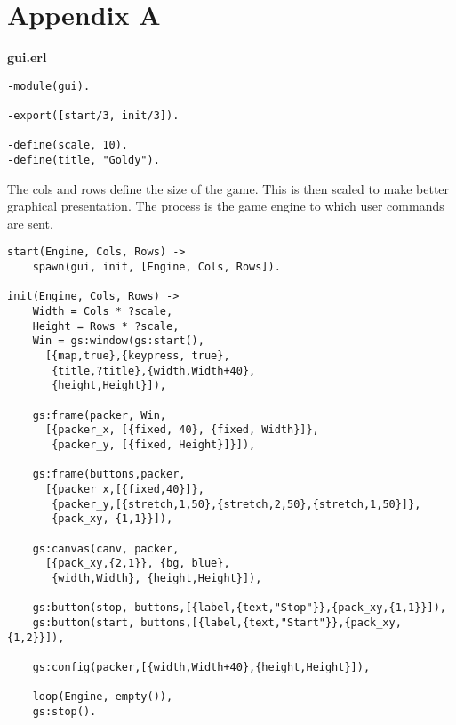 \documentclass[a4paper,11pt]{article}
\newcommand{\nnsection}[1]{
\section*{#1}
\addcontentsline{toc}{section}{#1}
}
\begin{document}
\nnsection{Appendix A}

{\bf gui.erl}

\begin{verbatim}
-module(gui).

-export([start/3, init/3]).

-define(scale, 10).
-define(title, "Goldy").
\end{verbatim}

The cols and rows define the size of the game. This is then scaled
to make better graphical presentation.  The process is the game
engine to which user commands are sent.

\begin{verbatim}
start(Engine, Cols, Rows) ->
    spawn(gui, init, [Engine, Cols, Rows]).

init(Engine, Cols, Rows) ->
    Width = Cols * ?scale,
    Height = Rows * ?scale,
    Win = gs:window(gs:start(),
      [{map,true},{keypress, true}, 
       {title,?title},{width,Width+40},
       {height,Height}]),

    gs:frame(packer, Win, 
      [{packer_x, [{fixed, 40}, {fixed, Width}]}, 
       {packer_y, [{fixed, Height}]}]),

    gs:frame(buttons,packer,
      [{packer_x,[{fixed,40}]},
       {packer_y,[{stretch,1,50},{stretch,2,50},{stretch,1,50}]},
       {pack_xy, {1,1}}]),

    gs:canvas(canv, packer,
      [{pack_xy,{2,1}}, {bg, blue}, 
       {width,Width}, {height,Height}]),

    gs:button(stop, buttons,[{label,{text,"Stop"}},{pack_xy,{1,1}}]),
    gs:button(start, buttons,[{label,{text,"Start"}},{pack_xy,{1,2}}]),

    gs:config(packer,[{width,Width+40},{height,Height}]),

    loop(Engine, empty()),
    gs:stop().
\end{verbatim}
\end{document}

